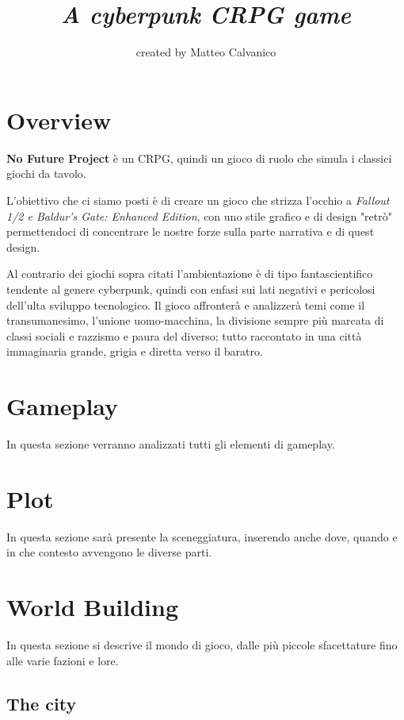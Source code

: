 \documentclass[a4paper]{report}
\title{ \textbf{\projectName} \\ \textit{A cyberpunk CRPG game}}
\author{created by Matteo Calvanico}
\date{}
\newcommand{\projectName}{No Future Project} %
\begin{document}
\maketitle

\pagebreak
\tableofcontents
\pagebreak

\chapter{Overview}
\textbf{\projectName} è un CRPG, quindi un gioco di ruolo che simula i classici giochi da tavolo.

L'obiettivo che ci siamo posti è di creare un gioco che strizza l'occhio a \textit{Fallout 1/2 e Baldur's Gate: Enhanced Edition}, con uno stile grafico e di design "retrò" permettendoci di concentrare le nostre forze sulla parte narrativa e di quest design.

Al contrario dei giochi sopra citati l'ambientazione è di tipo fantascientifico tendente al genere cyberpunk, quindi con enfasi sui lati negativi e pericolosi dell'ulta sviluppo tecnologico.
Il gioco affronterà e analizzerà temi come il transumanesimo, l'unione uomo-macchina, la divisione sempre più marcata di classi sociali e razzismo e paura del diverso; tutto raccontato in una città immaginaria grande, grigia e diretta verso il baratro.



\chapter{Gameplay}
In questa sezione verranno analizzati tutti gli elementi di gameplay.
\pagebreak %

\chapter{Plot}
In questa sezione sarà presente la sceneggiatura, inserendo anche dove, quando e in che contesto avvengono le diverse parti.
\pagebreak %

\chapter{World Building}
In questa sezione si descrive il mondo di gioco, dalle più piccole sfacettature fino alle varie fazioni e lore.
\section{The city}
\end{document}
